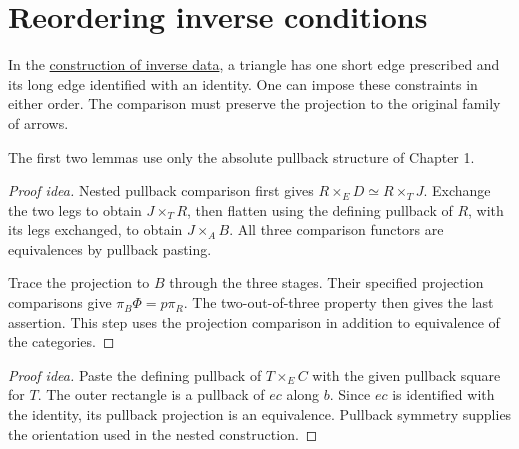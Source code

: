 \documentclass[11pt]{article}
\begin{document}
\section*{Reordering inverse conditions}

In the \href{rezk-axiom.html}{construction of inverse data}, a triangle
has one short edge prescribed and its long edge identified with an identity.
One can impose these constraints in either order. The comparison must
preserve the projection to the original family of arrows.

The first two lemmas use only the absolute pullback structure of Chapter 1.

\begin{proof}[Proof idea]
Nested pullback comparison first gives
$R\times_E D\simeq R\times_T J$. Exchange the two legs to obtain
$J\times_T R$, then flatten using the defining pullback of $R$, with
its legs exchanged, to obtain $J\times_A B$.
All three comparison functors are equivalences by pullback pasting.

Trace the projection to $B$ through the three stages. Their specified
projection comparisons give $\pi_B\Phi=p\pi_R$.
The two-out-of-three property then gives the last assertion. This step
uses the projection comparison in addition to equivalence of the categories.
\end{proof}

\begin{proof}[Proof idea]
Paste the defining pullback of $T\times_E C$ with the given pullback
square for $T$. The outer rectangle is a pullback of $ec$ along $b$.
Since $ec$ is identified with the identity, its pullback projection is
an equivalence. Pullback symmetry supplies the orientation used in the
nested construction.
\end{proof}
\end{document}
